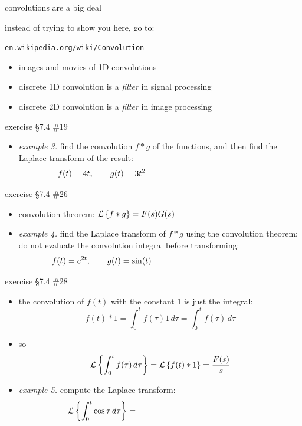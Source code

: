 \documentclass[urlcolor=blue,dvipsnames]{beamer}
\begin{document}
\begin{frame}{convolutions are a big deal}

instead of trying to show you here, go to:
\begin{center}
\href{https://en.wikipedia.org/wiki/Convolution}{\texttt{en.wikipedia.org/wiki/Convolution}}
\end{center}

\begin{itemize}
\item images and movies of 1D convolutions
\item discrete 1D convolution is a \emph{filter} in signal processing
\item discrete 2D convolution is a \emph{filter} in image processing
\end{itemize}
\end{frame}


\begin{frame}{exercise \S7.4 \#19}

\begin{itemize}
\item \emph{example 3.}  find the convolution $f\ast g$ of the functions, and then find the Laplace transform of the result:
    $$f(t)=4t, \qquad g(t)=3t^2 \hspace{50mm}$$
\end{itemize}

\vspace{50mm}
\end{frame}


\begin{frame}{exercise \S7.4 \#26}

\begin{itemize}
\item convolution theorem: \quad $\mathcal{L}\left\{f \ast g\right\} = F(s) G(s)$
\item \emph{example 4.}  find the Laplace transform of $f\ast g$ using the convolution theorem; do not evaluate the convolution integral before transforming:
    $$f(t)=e^{2t}, \qquad g(t)=\sin(t) \hspace{50mm}$$
\end{itemize}

\vspace{40mm}
\end{frame}


\begin{frame}{exercise \S7.4 \#28}

\begin{itemize}
\item the convolution of $f(t)$ with the constant 1 is just the integral:
    $$f(t) \ast 1 = \int_0^t f(\tau) 1\,d\tau = \int_0^t f(\tau)\,d\tau$$
\item so
    $$\mathcal{L}\left\{\int_0^t f(\tau)\,d\tau\right\} = \mathcal{L}\left\{f(t)\ast 1\right\} = \frac{F(s)}{s}$$
\item \emph{example 5.}  compute the Laplace transform:
    $$\LL{\int_0^t \cos \tau\,d\tau} = \hspace{50mm}$$
\end{itemize}

\vspace{25mm}
\end{frame}
\end{document}
